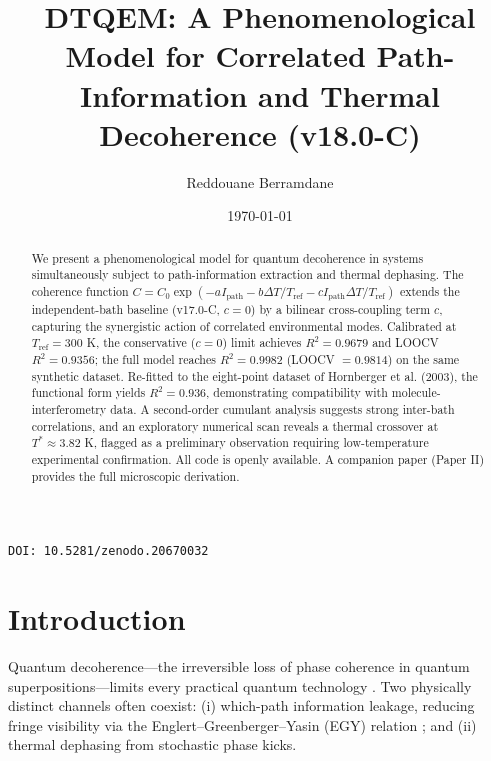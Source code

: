 \documentclass[aps,pra,reprint,amsmath,amssymb,superscriptaddress]{revtex4-2}
\begin{document}
\title{DTQEM: A Phenomenological Model for Correlated Path-Information and Thermal Decoherence (v18.0-C)}

\author{Reddouane Berramdane}

\date{\today}
\vspace{0.5cm}
\texttt{DOI: 10.5281/zenodo.20670032}

\begin{abstract}
We present a phenomenological model for quantum decoherence in systems simultaneously subject to path-information extraction and thermal dephasing. The coherence function $C = C_0 \exp(-a I_{\text{path}} - b\Delta T/T_{\text{ref}} - c I_{\text{path}}\Delta T/T_{\text{ref}})$ extends the independent-bath baseline (v17.0-C, $c=0$) by a bilinear cross-coupling term $c$, capturing the synergistic action of correlated environmental modes. Calibrated at $T_{\text{ref}} = 300$ K, the conservative ($c=0$) limit achieves $R^2 = 0.9679$ and LOOCV $R^2 = 0.9356$; the full model reaches $R^2 = 0.9982$ (LOOCV $= 0.9814$) on the same synthetic dataset. Re-fitted to the eight-point dataset of Hornberger et al. (2003), the functional form yields $R^2 = 0.936$, demonstrating compatibility with molecule-interferometry data. A second-order cumulant analysis suggests strong inter-bath correlations, and an exploratory numerical scan reveals a thermal crossover at $T^* \approx 3.82$ K, flagged as a preliminary observation requiring low-temperature experimental confirmation. All code is openly available. A companion paper (Paper II) provides the full microscopic derivation.
\end{abstract}

\maketitle

\section{Introduction}
Quantum decoherence---the irreversible loss of phase coherence in quantum superpositions---limits every practical quantum technology \cite{Breuer2002, Weiss2012}. Two physically distinct channels often coexist: (i) which-path information leakage, reducing fringe visibility via the Englert--Greenberger--Yasin (EGY) relation \cite{Englert1996}; and (ii) thermal dephasing from stochastic phase kicks.
\end{document}
